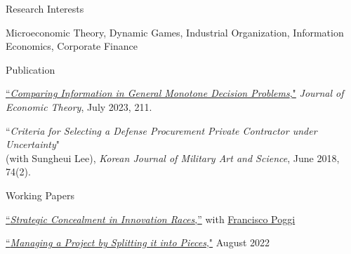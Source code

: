 
\begin{rSection}{Research Interests}
	
	Microeconomic Theory, 
	Dynamic Games, 
	Industrial Organization,
	Information Economics, 
	Corporate Finance
	
\end{rSection}



\medskip


\begin{rSection}{Publication}
	
	\begin{etaremune}
		\item \href{https://yonggyun-yg-kim.github.io/files/Research%20papers/GMDP_JET.pdf}{``\textit{Comparing Information in General Monotone Decision Problems},"} 
		\textit{Journal of Economic Theory}, July 2023, 211. 
		
		\item 
		``\textit{Criteria for Selecting a Defense Procurement Private Contractor under Uncertainty}"\\
		(with Sungheui Lee), \textit{Korean Journal of Military Art and Science}, June 2018, 74(2). 
	\end{etaremune}
	
	
	
\end{rSection}

\begin{rSection}{Working Papers}
	
	\begin{etaremune}
		
		\item \href{https://yonggyun-yg-kim.github.io/files/Research%20papers/SCIR_public.pdf}{``\textit{Strategic Concealment in Innovation Races},''}   with \href{https://www.franciscopoggi.com/}{Francisco Poggi}
		
		\item \href{https://ssrn.com/abstract=3450802}{``\textit{Managing a Project by Splitting it into Pieces},"} August 2022	
		
	\end{etaremune}
	
	
\end{rSection}


